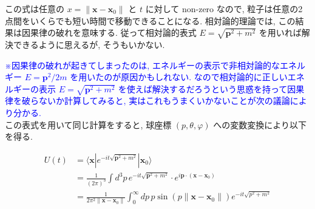 \documentclass[a4paper,12pt]{article}
\begin{document}
\color{black}
この式は任意の $x = \| \boldsymbol{x} - \boldsymbol{x}_0 \|$ と $t$ に対して non-zero なので, 粒子は任意の2点間をいくらでも短い時間で移動できることになる. 相対論的理論では, この結果は因果律の破れを意味する. 従って相対論的表式 $E = \sqrt{\boldsymbol{p}^2 + m^2}$ を用いれば解決できるように思えるが, そうもいかない.\par
\textcolor{blue}{※因果律の破れが起きてしまったのは, エネルギーの表示で非相対論的なエネルギー $E = \boldsymbol{p}^2/2m$ を用いたのが原因かもしれない. なので相対論的に正しいエネルギーの表示 $E = \sqrt{\boldsymbol{p}^2 + m^2}$ を使えば解決するだろうという思惑を持って因果律を破らないか計算してみると, 実はこれもうまくいかないことが次の議論により分かる.} \\
この表式を用いて同じ計算をすると, 球座標 $(p, \theta, \varphi)$ への変数変換により以下を得る.

\begin{align*}
  U(t) &= \langle \boldsymbol{x} | e^{-it\sqrt{\boldsymbol{p}^2 + m^2}} | \boldsymbol{x}_0 \rangle \\
  &= \frac{1}{(2\pi)^3} \int d^3p \, e^{-it\sqrt{\boldsymbol{p}^2 + m^2}} \cdot e^{i\boldsymbol{p} \cdot (\boldsymbol{x} - \boldsymbol{x}_0)} \\
  &= \frac{1}{2\pi^2 \| \boldsymbol{x} - \boldsymbol{x}_0 \|} \int_0^\infty dp \, p \sin(p \| \boldsymbol{x} - \boldsymbol{x}_0 \|) e^{-it\sqrt{p^2 + m^2}}
\end{align*}
\end{document}
